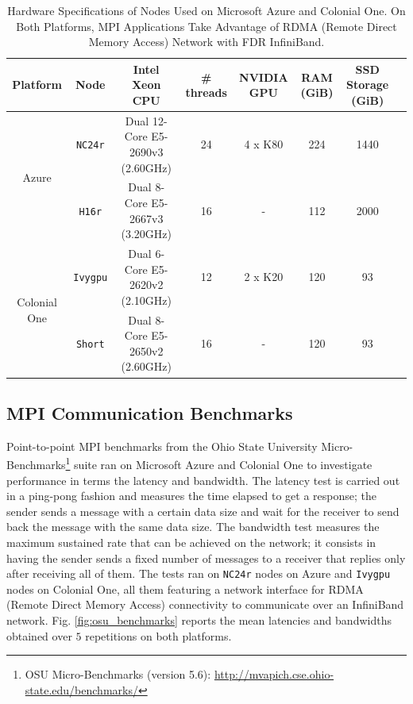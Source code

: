 \documentclass[10pt,journal,compsoc]{IEEEtran}
\begin{document}
\begin{table}[!h]
    \renewcommand{\arraystretch}{1.5}
    \caption{Hardware Specifications of Nodes Used on Microsoft Azure and Colonial One. On Both Platforms, MPI Applications Take Advantage of RDMA (Remote Direct Memory Access) Network with FDR InfiniBand.}
    \label{tab:hw_specs}
    \centering
    \begin{tabular}{cccccccc}
        Platform & Node & Intel Xeon CPU & \# threads & NVIDIA GPU & RAM (GiB) & SSD Storage (GiB) \\
        \hline
        \multirow{2}{*}{Azure} & \texttt{NC24r} & Dual 12-Core E5-2690v3 (2.60GHz) & 24 & 4 x K80 & 224 & 1440 \\
        & \texttt{H16r} & Dual 8-Core E5-2667v3 (3.20GHz) & 16 & - & 112 & 2000 \\
        \hline
        \multirow{2}{*}{Colonial One} & \texttt{Ivygpu} & Dual 6-Core E5-2620v2 (2.10GHz) & 12 & 2 x K20 & 120 & 93 \\
        & \texttt{Short} & Dual 8-Core E5-2650v2 (2.60GHz) & 16 & - & 120 & 93 \\
        \hline
    \end{tabular}
\end{table}

\subsection{MPI Communication Benchmarks}\label{subsec:mpi_benchmarks}

Point-to-point MPI benchmarks from the Ohio State University Micro-Benchmarks\footnote{OSU Micro-Benchmarks (version 5.6): \url{http://mvapich.cse.ohio-state.edu/benchmarks/}} suite ran on Microsoft Azure and Colonial One to investigate performance in terms the latency and bandwidth.
The latency test is carried out in a ping-pong fashion and measures the time elapsed to get a response; the sender sends a message with a certain data size and wait for the receiver to send back the message with the same data size.
The bandwidth test measures the maximum sustained rate that can be achieved on the network; it consists in having the sender sends a fixed number of messages to a receiver that replies only after receiving all of them.
The tests ran on \texttt{NC24r} nodes on Azure and \texttt{Ivygpu} nodes on Colonial One, all them featuring a network interface for RDMA (Remote Direct Memory Access) connectivity to communicate over an InfiniBand network.
Fig. \ref{fig:osu_benchmarks} reports the mean latencies and bandwidths obtained over $5$ repetitions on both platforms.
\end{document}
